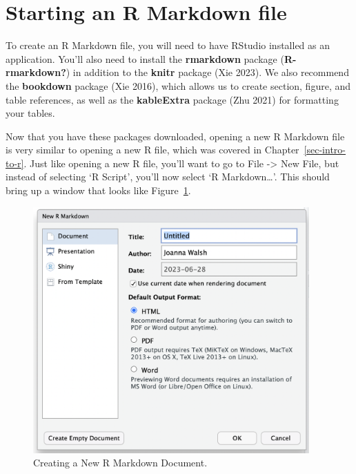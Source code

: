 \documentclass[
  letterpaper,
]{krantz}
\begin{document}
\hypertarget{starting-an-r-markdown-file}{%
\section{Starting an R Markdown
file}\label{starting-an-r-markdown-file}}

To create an R Markdown file, you will need to have RStudio installed as
an application. You'll also need to install the \textbf{rmarkdown}
package (\textbf{R-rmarkdown?}) in addition to the \textbf{knitr}
package (Xie 2023). We also recommend the \textbf{bookdown} package (Xie
2016), which allows us to create section, figure, and table references,
as well as the \textbf{kableExtra} package (Zhu 2021) for formatting
your tables.

Now that you have these packages downloaded, opening a new R Markdown
file is very similar to opening a new R file, which was covered in
Chapter~\ref{sec-intro-to-r}. Just like opening a new R file, you'll
want to go to File -\textgreater{} New File, but instead of selecting `R
Script', you'll now select `R Markdown\ldots{}'. This should bring up a
window that looks like Figure~\ref{fig-new-markdown}.

\begin{figure}

{\centering \includegraphics[width=4.16667in,height=\textheight]{book/images/12-new-r-markdown-window.png}

}

\caption{\label{fig-new-markdown}Creating a New R Markdown Document.}

\end{figure}
\end{document}
